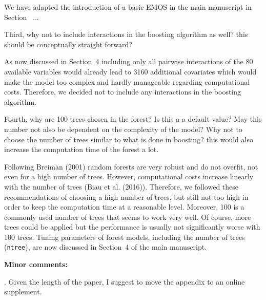\documentclass[american,foldmarks=false,noconfig]{uibklttr}
\newenvironment{review}{\fontshape{\itdefault}\fontseries{\bfdefault} \selectfont \smallskip}{\par}
\begin{document}
We have adapted the introduction of a basic EMOS in the main manuscript
in Section~ ...


\begin{review}
Third, why not to include interactions in the boosting algorithm 
as well? this should be conceptually straight forward? 
\end{review}

As now discussed in Section~4 including only all pairwise interactions
of the 80 available variables would already lead to 3160 additional
covariates which would make the model too complex and hardly manageable
regarding computational costs. Therefore, we decided not to include
any interactions in the boosting algorithm.

\begin{review}
Fourth, why are 100 trees chosen in the forest? Is this a a default 
value? May this number not also be dependent on the complexity of 
the model? Why not to choose the number of trees similar to what is 
done in boosting? this would also increase the computation time of 
the forest a lot.
\end{review}


Following Breiman (2001) random forests are very robust and do not overfit, 
not even for a high number of trees. However, computational costs increase 
linearly with the number of trees (Biau et al. (2016)).
Therefore, we followed these recommendations of choosing a high number of
trees, but still not too high in order to keep the computation time at
a reasonable level. Moreover, 100 is a commonly used number of trees that
seems to work very well. Of course, more trees could be applied but 
the performance is usually not significantly worse with 100 trees.
Tuning parameters of forest models, including the number of 
trees (\texttt{ntree}), are now discussed in Section~4 
of the main manuscript.





\bigskip

\textbf{Minor comments:}


\begin{review}
1. Given the length of the paper, I suggest to move the 
appendix to an online supplement.
\end{review}
\end{document}
